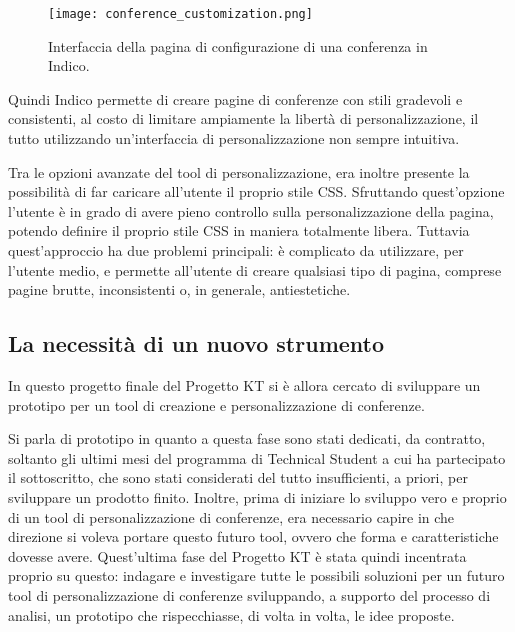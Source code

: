         \begin{figure}[h!]
            \begin{center}
        		\texttt{[image: conference\_customization.png]}
        	\end{center}
            \caption[Tool di configurazione di una conferenza in Indico]{Interfaccia della pagina di configurazione di una conferenza in Indico.}
            \label{fig:conference_customization}
        \end{figure}
        
        Quindi Indico permette di creare pagine di conferenze con stili gradevoli e consistenti, al costo di limitare ampiamente la libertà di personalizzazione, il tutto utilizzando un'interfaccia di personalizzazione non sempre intuitiva.
        
        Tra le opzioni avanzate del tool di personalizzazione, era inoltre presente la possibilità di far caricare all'utente il proprio stile \ac{CSS}. Sfruttando quest'opzione l'utente è in grado di avere pieno controllo sulla personalizzazione della pagina, potendo definire il proprio stile \ac{CSS} in maniera totalmente libera. Tuttavia quest'approccio ha due problemi principali: è complicato da utilizzare, per l'utente medio, e permette all'utente di creare qualsiasi tipo di pagina, comprese pagine brutte, inconsistenti o, in generale, antiestetiche.
        
        \subsection{La necessità di un nuovo strumento} \label{subsec:ccp;sa;necessità_nuovo_strumento}
        
            In questo progetto finale del Progetto KT si è allora cercato di sviluppare un prototipo per un tool di creazione e personalizzazione di conferenze.
            
            Si parla di prototipo in quanto a questa fase sono stati dedicati, da contratto, soltanto gli ultimi mesi del programma di Technical Student a cui ha partecipato il sottoscritto, che sono stati considerati del tutto insufficienti, a priori, per sviluppare un prodotto finito. Inoltre, prima di iniziare lo sviluppo vero e proprio di un tool di personalizzazione di conferenze, era necessario capire in che direzione si voleva portare questo futuro tool, ovvero che forma e caratteristiche dovesse avere. Quest'ultima fase del Progetto KT è stata quindi incentrata proprio su questo: indagare e investigare tutte le possibili soluzioni per un futuro tool di personalizzazione di conferenze sviluppando, a supporto del processo di analisi, un prototipo che rispecchiasse, di volta in volta, le idee proposte.
            
